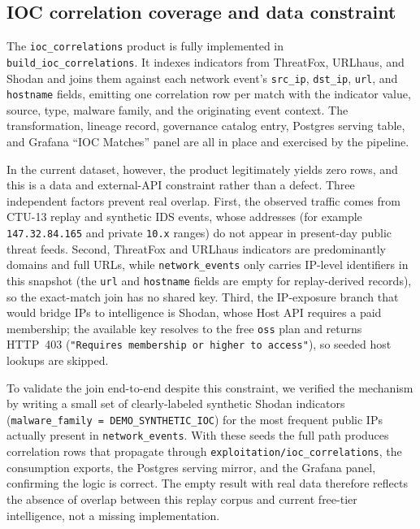 \documentclass[11pt,a4paper]{article}
\newcommand{\code}[1]{\nolinkurl{#1}}
\begin{document}
\subsection{IOC correlation coverage and data constraint}

The \code{ioc_correlations} product is fully implemented in \code{build_ioc_correlations}. It indexes indicators from ThreatFox, URLhaus, and Shodan and joins them against each network event's \code{src_ip}, \code{dst_ip}, \code{url}, and \code{hostname} fields, emitting one correlation row per match with the indicator value, source, type, malware family, and the originating event context. The transformation, lineage record, governance catalog entry, Postgres serving table, and Grafana ``IOC Matches'' panel are all in place and exercised by the pipeline.

In the current dataset, however, the product legitimately yields zero rows, and this is a data and external-API constraint rather than a defect. Three independent factors prevent real overlap. First, the observed traffic comes from CTU-13 replay and synthetic IDS events, whose addresses (for example \code{147.32.84.165} and private \code{10.x} ranges) do not appear in present-day public threat feeds. Second, ThreatFox and URLhaus indicators are predominantly domains and full URLs, while \code{network_events} only carries IP-level identifiers in this snapshot (the \code{url} and \code{hostname} fields are empty for replay-derived records), so the exact-match join has no shared key. Third, the IP-exposure branch that would bridge IPs to intelligence is Shodan, whose Host API requires a paid membership; the available key resolves to the free \code{oss} plan and returns HTTP~403 (\code{"Requires membership or higher to access"}), so seeded host lookups are skipped.

To validate the join end-to-end despite this constraint, we verified the mechanism by writing a small set of clearly-labeled synthetic Shodan indicators (\code{malware\_family = DEMO\_SYNTHETIC\_IOC}) for the most frequent public IPs actually present in \code{network_events}. With these seeds the full path produces correlation rows that propagate through \code{exploitation/ioc_correlations}, the consumption exports, the Postgres serving mirror, and the Grafana panel, confirming the logic is correct. The empty result with real data therefore reflects the absence of overlap between this replay corpus and current free-tier intelligence, not a missing implementation.
\end{document}

